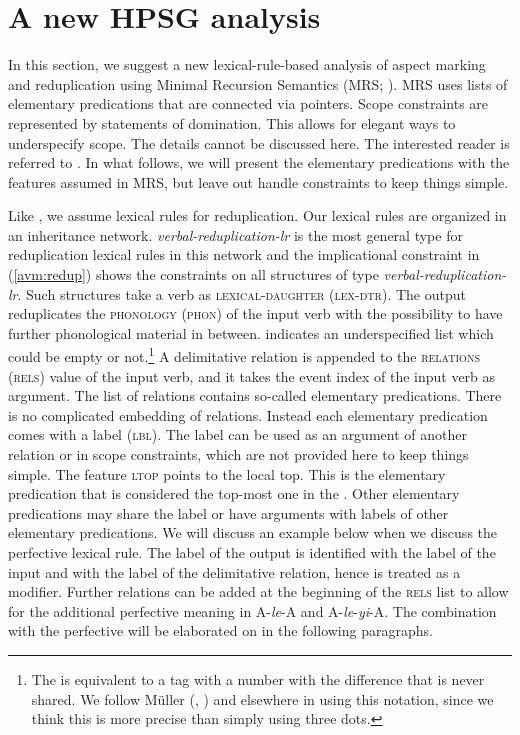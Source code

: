 \section{A new HPSG analysis}\label{sec:analysis}

In this section, we suggest a new lexical-rule-based analysis of aspect marking and reduplication
using Minimal Recursion Semantics (MRS; \citealt{Copestakeetal2005}). %
MRS uses lists of elementary predications that are connected via pointers. Scope constraints are
represented by statements of domination. This allows for elegant ways to underspecify scope. The
details cannot be discussed here. The interested reader is referred to \citet{Copestakeetal2005}. In
what follows, we will present the elementary predications with the features assumed in MRS, but leave
out handle constraints to keep things simple.

Like \citet{FanSongBond2015}, we assume lexical rules for reduplication. Our lexical rules are
organized in an inheritance network. \textit{verbal-reduplication-lr} is the most general type for
reduplication lexical rules in this network and the implicational constraint in (\ref{avm:redup}) shows the constraints on all
structures of type \textit{verbal-reduplication-lr}. Such structures take a verb as
\textsc{lexical-daughter (lex-dtr)}.  The output reduplicates the \textsc{phonology (phon)} of the
input verb with the possibility to have further phonological material in between.  \etag{} indicates
an underspecified list which could be empty or not.\footnote{%
The \etag is equivalent to a tag with a number with the difference that \etag is never shared. We
follow Müller (\citeyear[161]{Mueller2002b}, \citeyear[294]{Mueller2003e}) and elsewhere in using this
notation, since we think this is more
precise than simply using three dots.}
A delimitative relation is appended to the
\textsc{relations (rels)} value of the input verb, and it takes the event index of the input verb  as
argument. The list of relations contains so-called elementary predications. There is no complicated
embedding of relations. Instead each elementary predication comes with a label (\textsc{lbl}). The
label can be used as an argument of another relation or in scope constraints, which are not provided
here to keep things simple. The feature \textsc{ltop} points to the local top. This is the
elementary predication that is considered the top-most one in the \relsl. Other elementary
predications may share the label or have arguments with labels of other elementary predications. We
will discuss an example below when we discuss the perfective lexical rule.
The label of the output  is identified with the label of the input and with the
label of the delimitative relation, hence  is treated as a modifier.  Further
relations can be added at the beginning of the \textsc{rels} list to allow for the additional
perfective meaning in A-\textit{le}-A and A-\textit{le}-\textit{yi}-A.  The combination with the
perfective will be elaborated on in the following paragraphs.

